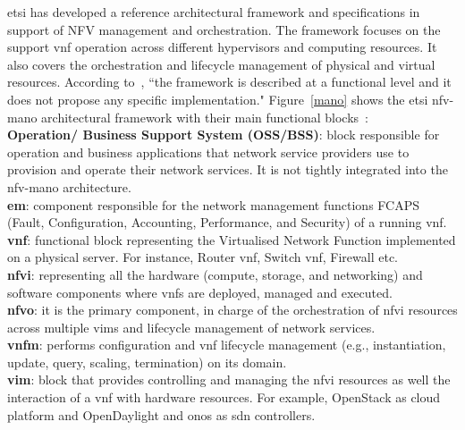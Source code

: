 \gls{etsi} has developed a reference architectural framework and specifications in support of NFV management and orchestration. The framework focuses on the support \gls{vnf} operation across different hypervisors and computing resources. It also covers the orchestration and lifecycle management of physical and virtual resources. According to~\cite{ETSIIndustrySpecificationGroupISGNFV2013NetworkFramework}, ``the framework is described at a functional level and it does not propose any specific implementation." Figure~\ref{mano} shows the \gls{etsi} \gls{nfv}-\acrfull{mano} architectural framework with their main functional blocks~\cite{ETSIIndustrySpecificationGroupISGNFV2014NetworkOptions}:
 \\
 \noindent \textbf{Operation/ Business Support System (OSS/BSS)}: block responsible for operation and business applications that network service providers use to provision and operate their network services. It is not tightly integrated into the \gls{nfv}-\gls{mano} architecture.
 \\
\noindent \textbf{\gls{em}}: component responsible for the network management functions FCAPS (Fault, Configuration, Accounting, Performance, and Security) of a running \gls{vnf}.
\\
\noindent\textbf{\gls{vnf}}: functional block representing the Virtualised Network Function implemented on a physical server. For instance, Router \gls{vnf}, Switch \gls{vnf}, Firewall etc.
\\
\noindent \textbf{\gls{nfvi}}: representing all the hardware (compute, storage, and networking) and software components where \glspl{vnf} are deployed, managed and executed. 
\\
\noindent \textbf{\gls{nfvo}}: it is the primary component, in charge of the orchestration of \gls{nfvi} resources across multiple \glspl{vim} and lifecycle management of network services. 
\\
\noindent\textbf{\gls{vnfm}}: performs configuration and \gls{vnf} lifecycle management (e.g., instantiation, update, query, scaling, termination) on its domain.
\\
\noindent \textbf{\gls{vim}}: block that provides controlling and managing the \gls{nfvi} resources as well the interaction of a \gls{vnf} with hardware resources. For example, OpenStack as cloud platform and OpenDaylight and \gls{onos} as \gls{sdn} controllers.
 

